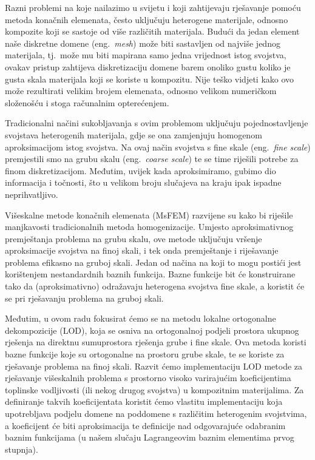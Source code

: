 \documentclass[zavrsnirad]{fer}
\begin{document}
Razni problemi na koje nailazimo u svijetu i koji zahtijevaju rješavanje pomoću metoda konačnih elemenata,
često uključuju heterogene materijale, odnosno kompozite koji se sastoje od više različitih materijala.
Budući da jedan element naše diskretne domene (eng.\ \textit{mesh}) može biti sastavljen od najviše jednog materijala,
tj.\ može mu biti mapirana samo jedna vrijednost istog svojstva, ovakav pristup zahtijeva diskretizaciju domene
barem onoliko gustu koliko je gusta skala materijala koji se koriste u kompozitu.
Nije teško vidjeti kako ovo može rezultirati velikim brojem elemenata, odnosno velikom numeričkom složenošću i stoga računalnim opterećenjem.

Tradicionalni načini sukobljavanja s ovim problemom uključuju pojednostavljenje svojstava heterogenih materijala,
gdje se ona zamjenjuju homogenom aproksimacijom istog svojstva. Na ovaj način svojstva s fine skale (eng.\ \textit{fine scale}) premjestili smo na
grubu skalu (eng.\ \textit{coarse scale}) te se time riješili potrebe za finom diskretizacijom. Međutim, uvijek kada aproksimiramo,
gubimo dio informacija i točnosti, što u velikom broju slučajeva na kraju ipak ispadne neprihvatljivo.

Višeskalne metode konačnih elemenata (MsFEM) razvijene su kako bi riješile manjkavosti tradicionalnih metoda homogenizacije.
Umjesto aproksimativnog premještanja problema na grubu skalu, ove metode uključuju vršenje aproksimacije svojstva na finoj skali,
i tek onda premještanje i riješavanje problema efikasno na gruboj skali. Jedan od načina na koji to mogu postići jest korištenjem nestandardnih baznih funkcija.
Bazne funkcije bit će konstruirane tako da (aproksimativno) odražavaju heterogena svojstva fine skale, a koristit će se pri rješavanju problema na gruboj skali.

Međutim, u ovom radu fokusirat ćemo se na metodu lokalne ortogonalne dekompozicije (LOD),
koja se osniva na ortogonalnoj podjeli prostora ukupnog rješenja na direktnu sumuprostora rješenja grube i fine skale.
Ova metoda koristi bazne funkcije koje su ortogonalne na prostoru grube skale, te se koriste za rješavanje problema na finoj skali.
Razvit ćemo implementaciju LOD metode za rješavanje višeskalnih problema s prostorno visoko varirajućim koeficijentima toplinske vodljivosti
(ili nekog drugog svojstva) u kompozitnim materijalima. Za definiranje takvih koeficijentata koristit ćemo vlastitu implementaciju
koja upotrebljava podjelu domene na poddomene s različitim heterogenim svojstvima, a koeficijent će biti aproksimacija te definicije nad
odgovarajuće odabranim baznim funkcijama (u našem slučaju Lagrangeovim baznim elementima prvog stupnja).
\end{document}
